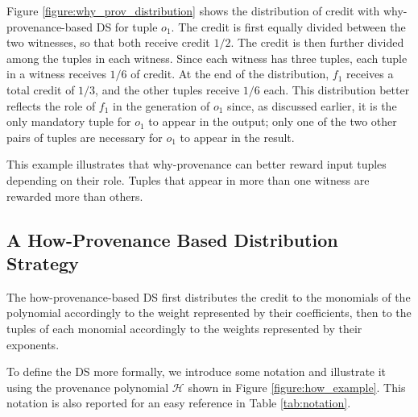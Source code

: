 Figure \ref{figure:why_prov_distribution} shows the distribution of credit with why-provenance-based DS for tuple $o_1$.
The credit is first equally divided between the two witnesses, so that both receive credit $1/2$. 
The credit is then further divided among the tuples in each witness. Since each witness has three tuples, each tuple in a witness receives $1/6$ of credit. At the end of the distribution, $f_1$ receives a total credit of $1/3$, and the other tuples receive $1/6$ each.
This distribution better reflects the role of $f_1$ in the generation of $o_1$ since, as discussed earlier, it is the only mandatory tuple for $o_1$ to appear in the output; only one of the two other pairs of tuples are necessary for $o_1$ to appear in the result. 

This example illustrates that why-provenance can better reward input tuples depending on their role. Tuples that appear in more than one witness are rewarded more than others. 

\subsection{A How-Provenance Based Distribution Strategy}
\label{section:how_prov_distr_tuples}



The how-provenance-based DS first distributes the credit to the monomials of the polynomial accordingly to the weight represented by their coefficients, then to the tuples of each monomial accordingly to the weights represented by their exponents. 

To define the DS more formally, we introduce some notation and illustrate it using the provenance polynomial $\mathcal{H}$ shown in Figure \ref{figure:how_example}. This notation is also reported for an easy reference in Table \ref{tab:notation}.

